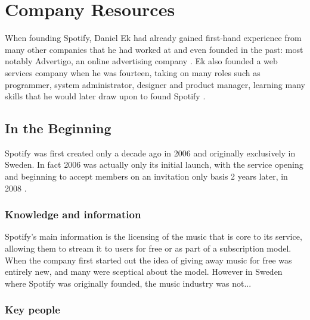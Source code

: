 \section{Company Resources}

When founding Spotify, Daniel Ek had already gained first-hand experience from many other companies that he had worked at and even founded in the past: most notably Advertigo, an online advertising company \parencite{Alexander2013}. Ek also founded a web services company when he was fourteen, taking on many roles such as programmer, system administrator, designer and product manager, learning many skills that he would later draw upon to found Spotify \parencite{wired_influencer}.

\subsection{In the Beginning}

Spotify was first created only a decade ago in 2006 \parencite{spotify_story_so_far, spotify_whois} and originally exclusively in Sweden. In fact 2006 was actually only its initial launch, with the service opening and beginning to accept members on an invitation only basis 2 years later, in 2008 \parencite{spotify_story_so_far}.

\subsubsection{Knowledge and information}

Spotify's main information is the licensing of the music that is core to its service, allowing them to stream it to users for free or as part of a subscription model. When the company first started out the idea of giving away music for free was entirely new, and many were sceptical about the model. However in Sweden where Spotify was originally founded, the music industry was not... 

\subsubsection{Key people} \label{resources:beginning:keypeople}

